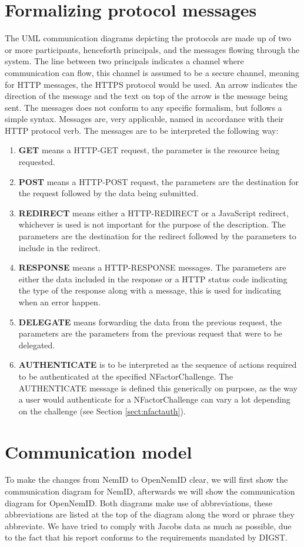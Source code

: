 \documentclass[twosided]{report}
\begin{document}
\section{Formalizing protocol messages}
The UML communication diagrams depicting the protocols are made up of two or more participants, henceforth principals, and the messages flowing through the system. The line between two principals indicates a channel where communication can flow, this channel is assumed to be a secure channel, meaning for HTTP messages, the HTTPS protocol would be used. An arrow indicates the direction of the message and the text on top of the arrow is the message being sent. The messages does not conform to any specific formalism, but follows a simple syntax. Messages are, very applicable, named in accordance with their HTTP protocol verb. The messages are to be interpreted the following way:
\begin{enumerate}
	\item[] \textbf{GET} means a HTTP-GET request, the parameter is the resource being requested.
	\item[] \textbf{POST} means a HTTP-POST request, the parameters are the destination for the request followed by the data being submitted.
	\item[] \textbf{REDIRECT} means either a HTTP-REDIRECT or a JavaScript redirect, whichever is used is not important for the purpose of the description. The parameters are the destination for the redirect followed by the parameters to include in the redirect.
	\item[] \textbf{RESPONSE} means a HTTP-RESPONSE messages. The parameters are either the data included in the response or a HTTP status code indicating the type of the response along with a message, this is used for indicating when an error happen.
	\item[] \textbf{DELEGATE} means forwarding the data from the previous request, the parameters are the parameters from the previous request that were to be delegated.
	\item[] \textbf{AUTHENTICATE} is to be interpreted as the sequence of actions required to be authenticated at the specified NFactorChallenge. The AUTHENTICATE message is defined this generically on purpose, as the way a user would authenticate for a NFactorChallenge can vary a lot depending on the challenge (see Section \ref{sect:nfactauth}).
\end{enumerate}

\section{Communication model}
To make the changes from NemID to OpenNemID clear, we will first show the communication diagram for NemID, afterwards we will show the communication diagram for OpenNemID. Both diagrams make use of abbreviations, these abbreviations are listed at the top of the diagram along the word or phrase they abbreviate. We have tried to comply with Jacobs data as much as possible, due to the fact that his report conforms to the requirements mandated by DIGST.
\end{document}
